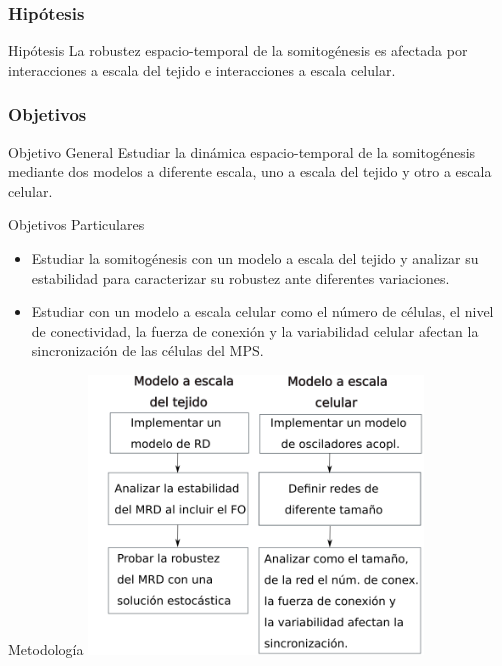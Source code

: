 \documentclass[xcolor=table, xllnames]{beamer}
\begin{document}
\begin{frame}
	\frametitle{Hip\'otesis} 
	\begin{block}{Hip\'otesis}
	La robustez espacio-temporal de la somitogénesis es afectada por interacciones a escala del tejido e interacciones a escala celular.
	
	\end{block}
\end{frame}

\begin{frame}
	\frametitle{Objetivos}
	\begin{block}{Objetivo General}
	Estudiar la dinámica espacio-temporal de la somitogénesis mediante dos modelos a diferente escala, uno a escala del tejido y otro a escala celular.
	
	\end{block}
	\pause
	\begin{block}{Objetivos Particulares}
		\begin{itemize}
		
			\item Estudiar la somitogénesis con un modelo a escala del tejido y analizar su estabilidad para caracterizar su robustez ante diferentes variaciones.
			\item Estudiar con un modelo a escala celular como el número de células, el nivel de conectividad, la fuerza de conexión y la variabilidad celular afectan la sincronización de las células del MPS.	
		
		\end{itemize}
	\end{block}
\end{frame}


\begin{frame}{Metodología}
	\centering
	\includegraphics[width=3.5in]{Figuras/metodologia.png}
	
\end{frame}
\end{document}
